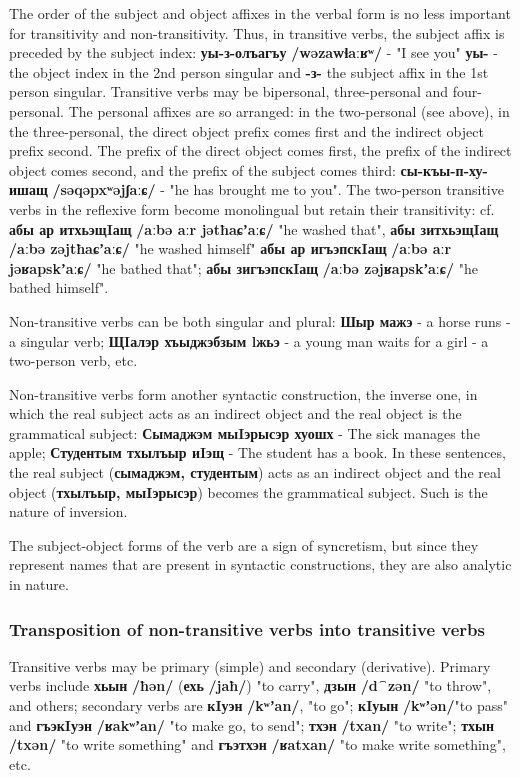 \documentclass[a4paper,12pt]{book}
\newcommand{\1}[1]{\textbf{\emph{#1}}} %
\newcommand{\2}[1]{\textbf{[#1]}} %
\newcommand{\3}[1]{\fontsize{11pt}{0cm}\textbf{\emph{#1}}} %
\newcommand{\4}[1]{\fontsize{10pt}{0cm}\emph{#1}}	%
\newcommand{\5}[1]{\textbf{/#1/}} %
\newcommand{\6}[1]{\textbf{[#1]}} %
\newcommand{\7}[1]{\fontsize{12pt}{0cm}\emph{#1}} %
\newcommand{\8}[1]{\fontsize{12pt}{0cm}`#1'} %
\newcommand{\9}[1]{\fontsize{12pt}{0cm}(lit. `#1')} %
\newcommand{\glossphonemics}[1]{\textbf{/#1/}} %
\begin{document}
The order of the subject and object affixes in the verbal form is no less important for transitivity and non-transitivity. Thus, in transitive verbs, the subject affix is preceded by the subject index: \textbf{уы-з-олъагъу} \glossphonemics{wəzawɬaːʁʷ} - "I see you" \textbf{уы-} - the object index in the 2nd person singular and \textbf{-з-} the subject affix in the 1st person singular. Transitive verbs may be bipersonal, three-personal and four-personal. The personal affixes are so arranged: in the two-personal (see above), in the three-personal, the direct object prefix comes first and the indirect object prefix second. The prefix of the direct object comes first, the prefix of the indirect object comes second, and the prefix of the subject comes third: \textbf{сы-къы-п-ху-ишащ} \glossphonemics{səqəpxʷəjʃaːɕ} - "he has brought me to you". The two-person transitive verbs in the reflexive form become monolingual but retain their transitivity: cf. \textbf{абы ар итхьэщIащ} \glossphonemics{aːbə aːr jətħaɕʼaːɕ} "he washed that", \textbf{абы зитхьэщIащ} \glossphonemics{aːbə zəjtħaɕʼaːɕ} "he washed himself" \textbf{абы ар игъэпскIащ} \glossphonemics{aːbə aːr jəʁapskʼaːɕ} "he bathed that"; \textbf{абы зигъэпскIащ} \glossphonemics{aːbə zəjʁapskʼaːɕ} "he bathed himself".

Non-transitive verbs can be both singular and plural: \textbf{Шыр мажэ} - a horse runs - a singular verb; \textbf{ЩIалэр хъыджэбзым lжьэ} - a young man waits for a girl - a two-person verb, etc.

Non-transitive verbs form another syntactic construction, the inverse one, in which the real subject acts as an indirect object and the real object is the grammatical subject: \textbf{Сымаджэм мыIэрысэр хуошх} - The sick manages the apple; \textbf{Студентым тхылъыр иIэщ} - The student has a book. In these sentences, the real subject (\textbf{сымаджэм, студентым}) acts as an indirect object and the real object (\textbf{тхылъыр, мыIэрысэр}) becomes the grammatical subject. Such is the nature of inversion.

The subject-object forms of the verb are a sign of syncretism, but since they represent names that are present in syntactic constructions, they are also analytic in nature.
\subsubsection{Transposition of non-transitive verbs into transitive verbs}
Transitive verbs may be primary (simple) and secondary (derivative). Primary verbs include \textbf{хьын} \glossphonemics{ħən} (\textbf{ехь} \glossphonemics{jaħ}) "to carry", \textbf{дзын} \glossphonemics{d⁀zən} "to throw", and others; secondary verbs are \textbf{кIуэн} \glossphonemics{kʷʼan}, "to go"; \textbf{кIуын} \glossphonemics{kʷʼən}"to pass" and \textbf{гъэкIуэн} \glossphonemics{ʁakʷʼan} "to make go, to send"; \textbf{тхэн} \glossphonemics{txan} "to write"; \textbf{тхын} \glossphonemics{txən} "to write something" and \textbf{гъэтхэн} \glossphonemics{ʁatxan} "to make write something", etc.
\end{document}
